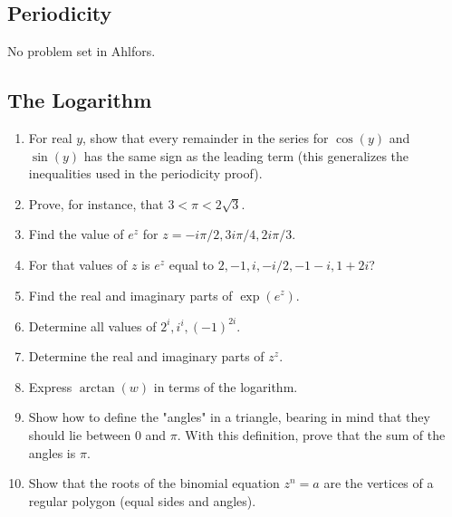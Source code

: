 \subsection{Periodicity}

No problem set in Ahlfors.

\subsection{The Logarithm}

\begin{enumerate}
\item
  For real \(y\), show that every remainder in the series for \(\cos(y)\) and
  \(\sin(y)\) has the same sign as the leading term (this generalizes the
  inequalities used in the periodicity proof).
\item
  Prove, for instance, that \(3 < \pi < 2\sqrt{3}\).
\item
  Find the value of \(e^z\) for \(z = -i\pi/2,3i\pi/4,2i\pi/3\).
\item
  For that values of \(z\) is \(e^z\) equal to \(2,-1,i,-i/2,-1 - i,1 + 2i\)?
\item
  Find the real and imaginary parts of \(\exp(e^z)\).
\item
  Determine all values of \(2^i,i^i,(-1)^{2i}\).
\item
  Determine the real and imaginary parts of \(z^z\).
\item
  Express \(\arctan(w)\) in terms of the logarithm.
\item
  Show how to define the "angles" in a triangle, bearing in mind that they
  should lie between \(0\) and \(\pi\).
  With this definition, prove that the sum of the angles is \(\pi\).
\item
  Show that the roots of the binomial equation \(z^n = a\) are the vertices of
  a regular polygon (equal sides and angles).
\end{enumerate}

